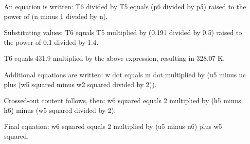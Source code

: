 An equation is written:  
T6 divided by T5 equals (p6 divided by p5) raised to the power of (n minus 1 divided by n).  

Substituting values:  
T6 equals T5 multiplied by (0.191 divided by 0.5) raised to the power of 0.1 divided by 1.4.  

T6 equals 431.9 multiplied by the above expression, resulting in 328.07 K.  

Additional equations are written:  
w dot equals m dot multiplied by (u5 minus uc plus (w5 squared minus w2 squared divided by 2)).  

Crossed-out content follows, then:  
w6 squared equals 2 multiplied by (h5 minus h6) minus (w5 squared divided by 2).  

Final equation:  
w6 squared equals 2 multiplied by (u5 minus u6) plus w5 squared.